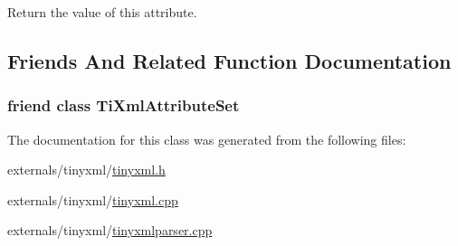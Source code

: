 Return the value of this attribute. 



\subsection{Friends And Related Function Documentation}
\hypertarget{class_ti_xml_attribute_a35a7b7f89f708527677d5078d41ce0bf}{
\subsubsection[{Ti\-Xml\-Attribute\-Set}]{\setlength{\rightskip}{0pt plus 5cm}friend class {\bf Ti\-Xml\-Attribute\-Set}\hspace{0.3cm}{\ttfamily [friend]}}}\label{class_ti_xml_attribute_a35a7b7f89f708527677d5078d41ce0bf}


The documentation for this class was generated from the following files\-:\begin{DoxyCompactItemize}
\item 
externals/tinyxml/\hyperlink{tinyxml_8h}{tinyxml.\-h}\item 
externals/tinyxml/\hyperlink{tinyxml_8cpp}{tinyxml.\-cpp}\item 
externals/tinyxml/\hyperlink{tinyxmlparser_8cpp}{tinyxmlparser.\-cpp}\end{DoxyCompactItemize}
